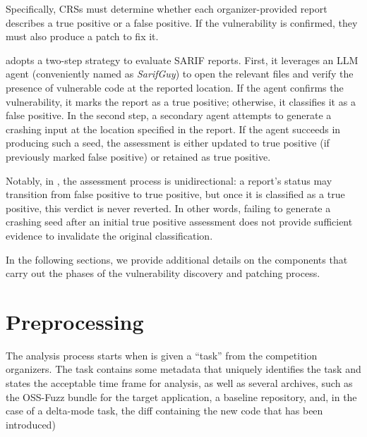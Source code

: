 Specifically, CRSs must determine whether each organizer-provided report describes a true positive or a false positive. If the vulnerability is confirmed, they must also produce a patch to fix it.

\artiphishell adopts a two-step strategy to evaluate SARIF reports.
First, it leverages an LLM agent (conveniently named as \emph{SarifGuy}) to open the relevant files and verify the presence of vulnerable code at the reported location. If the agent confirms the vulnerability, it marks the report as a true positive; otherwise, it classifies it as a false positive.
In the second step, a secondary agent attempts to generate a crashing input at the location specified in the report. If the agent succeeds in producing such a seed, the assessment is either updated to true positive (if previously marked false positive) or retained as true positive.

Notably, in \artiphishell, the assessment process is unidirectional: a report's status may transition from false positive to true positive, but once it is classified as a true positive, this verdict is never reverted. In other words, failing to generate a crashing seed after an initial true positive assessment does not provide sufficient evidence to invalidate the original classification.


\medskip

In the following sections, we provide additional details on the components that carry out the phases of the vulnerability discovery and patching process.

\section{Preprocessing}
\label{preprocessing}

The analysis process starts when \artiphishell is given a ``task'' from the competition organizers.
The task contains some metadata that uniquely identifies the task and states the acceptable time frame for analysis, as well as several archives, such as the OSS-Fuzz bundle for the target application, a baseline repository, and, in the case of a delta-mode task, the diff containing the new code that has been introduced)

